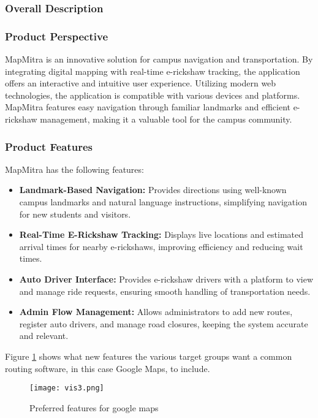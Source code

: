 \subsubsection{Overall Description}

\subsubsection*{Product Perspective}
MapMitra is an innovative solution for campus navigation and transportation. By integrating digital mapping with real-time e-rickshaw tracking, the application offers an interactive and intuitive user experience. Utilizing modern web technologies, the application is compatible with various devices and platforms. MapMitra features easy navigation through familiar landmarks and efficient e-rickshaw management, making it a valuable tool for the campus community.

\subsubsection*{Product Features}
MapMitra has the following features:
\begin{itemize}
	\item \textbf{Landmark-Based Navigation:} Provides directions using well-known campus landmarks and natural language instructions, simplifying navigation for new students and visitors.
	\item \textbf{Real-Time E-Rickshaw Tracking:} Displays live locations and estimated arrival times for nearby e-rickshaws, improving efficiency and reducing wait times.
	\item \textbf{Auto Driver Interface:} Provides e-rickshaw drivers with a platform to view and manage ride requests, ensuring smooth handling of transportation needs.
	\item \textbf{Admin Flow Management:} Allows administrators to add new routes, register auto drivers, and manage road closures, keeping the system accurate and relevant.
\end{itemize}

\noindent Figure \ref{fig:gmaps} shows what new features the various target groups want a common routing software, in this case Google Maps, to include.

\begin{figure}[H]
	\centering
	\texttt{[image: vis3.png]}
	\caption{Preferred features for google maps}
	\label{fig:gmaps}
\end{figure}

